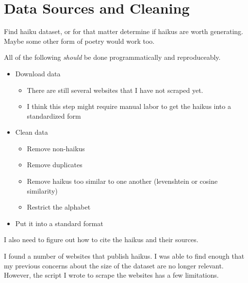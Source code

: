 \section{Data Sources and Cleaning}\label{sec:data}

{\color{red}
      Find haiku dataset, or for that matter determine if haikus are worth generating.
      Maybe some other form of poetry would work too.

      All of the following \textit{should} be done programmatically and reproduceably.
      \begin{itemize}
            \item Download data
                  \begin{itemize}
                        \item There are still several websites that I have not scraped yet.
                        \item I think this step might require manual labor to get the haikus into a standardized form
                  \end{itemize}
            \item Clean data
                  \begin{itemize}
                        \item Remove non-haikus
                        \item Remove duplicates
                        \item Remove haikus too similar to one another (levenshtein or cosine similarity)
                        \item Restrict the alphabet
                  \end{itemize}
            \item Put it into a standard format
      \end{itemize}

      I also need to figure out how to cite the haikus and their sources.
}

I found a number of websites that publish haikus.
I was able to find enough that my previous concerns about the size of the dataset are no longer relevant.
However, the script I wrote to scrape the websites has a few limitations.

